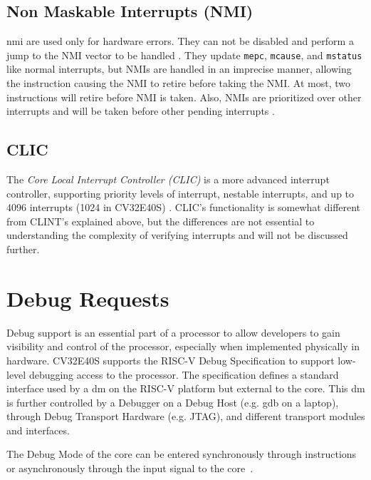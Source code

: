 \subsection{Non Maskable Interrupts (NMI)}

\acrfull{nmi} are used only for hardware errors. They can not be disabled and perform a jump to the NMI vector to be handled \cite{watermanRISCVInstructionSet2021}. They update \lstinline{mepc}, \lstinline{mcause}, and \lstinline{mstatus} like normal interrupts, but NMIs are handled in an imprecise manner, allowing the instruction causing the NMI to retire before taking the NMI. At most, two instructions will retire before NMI is taken. 
Also, NMIs are prioritized over other interrupts and will be taken before other pending interrupts \cite{openhwgroupExceptionsInterruptsCOREV2023}.

\subsection{CLIC}

The \textit{Core Local Interrupt Controller (CLIC)} is a more advanced interrupt controller, supporting priority levels of interrupt, nestable interrupts, and up to 4096 interrupts (1024 in CV32E40S) \cite{openhwgroupExceptionsInterruptsCOREV2023}. CLIC's functionality is somewhat different from CLINT's explained above, but the differences are not essential to understanding the complexity of verifying interrupts and will not be discussed further. 



\section{Debug Requests}
\label{sec:bg_debug}

Debug support is an essential part of a processor to allow developers to gain visibility and control of the processor, especially when implemented physically in hardware. CV32E40S supports the RISC-V Debug Specification \cite{pauldonahueRISCVDebugSupport2023} to support low-level debugging access to the processor. The specification defines a standard interface used by a \acrfull{dm} on the RISC-V platform but external to the core. This \acrshort{dm} is further controlled by a Debugger on a Debug Host (e.g. gdb on a laptop), through Debug Transport Hardware (e.g. JTAG), and different transport modules and interfaces. 

The Debug Mode of the core can be entered synchronously through  instructions or asynchronously through the  input signal to the core~\cite{openhwgroupDebugTriggerCOREV2023}.

